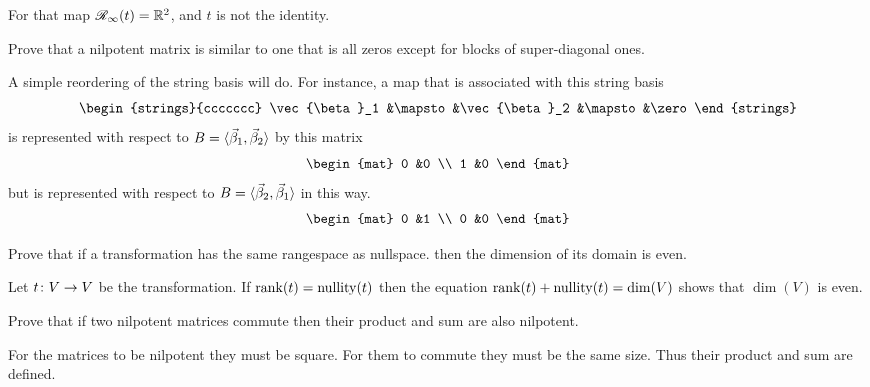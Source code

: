 \begin{exercises}
\begin{answer}
      For that map $\mathscr{R}_\infty(t)=\mathbb{R}^2$, and $t$ is not the identity.
    \end{answer}
  \item 
    Prove that a nilpotent matrix is similar to one that is all zeros
    except for blocks of super-diagonal ones.
    \begin{answer}
      A simple reordering of the string basis will do.
      For instance, a map that is associated with this string basis
      \begin{equation*}
         \begin{strings}{ccccccc}
            \vec{\beta}_1 &\mapsto &\vec{\beta}_2 &\mapsto &\zero  
         \end{strings}
      \end{equation*}
      is represented with respect to 
      $B=\langle\vec{\beta}_1,\vec{\beta}_2\rangle$ by this matrix
      \begin{equation*}
        \begin{mat}
          0  &0  \\
          1  &0          
        \end{mat}
      \end{equation*}
      but is represented with respect to 
      $B=\langle\vec{\beta}_2,\vec{\beta}_1\rangle$ in this way.
      \begin{equation*}
        \begin{mat}
          0  &1  \\
          0  &0          
        \end{mat}
      \end{equation*}
    \end{answer}
  \recommended \item
    Prove that if a transformation has the same rangespace as nullspace.
    then the dimension of its domain is even.
    \begin{answer}
      Let $\mbox{$t\colon V\to V$}$ be the transformation.
      If \( \operatorname{rank} (t)=\operatorname{nullity} (t) \) then the equation
      \( \operatorname{rank}(t)+\operatorname{nullity}(t)=\dim (V) \) shows that 
      \( \dim (V) \) is even.  
    \end{answer}
  \item 
    Prove that if two nilpotent matrices commute then their product and
    sum are also nilpotent.
    \begin{answer}
      For the matrices to be nilpotent they must be square.
      For them to commute they must be the same size.
      Thus their product and sum are defined.


\end{answer}
\end{exercises}
